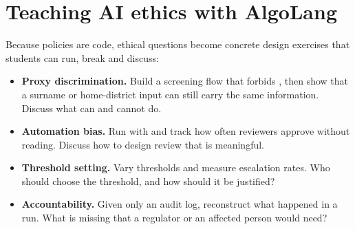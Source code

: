 \section{Teaching AI ethics with AlgoLang}

Because policies are code, ethical questions become concrete design exercises that students can run, break and discuss:

\begin{itemize}
  \item \textbf{Proxy discrimination.} Build a screening flow that forbids , then show that a surname or home-district input can still carry the same information. Discuss what  can and cannot do.
  \item \textbf{Automation bias.} Run with  and track how often reviewers approve without reading. Discuss how to design review that is meaningful.
  \item \textbf{Threshold setting.} Vary  thresholds and measure escalation rates. Who should choose the threshold, and how should it be justified?
  \item \textbf{Accountability.} Given only an audit log, reconstruct what happened in a run. What is missing that a regulator or an affected person would need?
\end{itemize}
